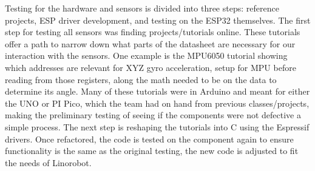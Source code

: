 \documentclass[conference]{IEEEtran}
\begin{document}
Testing for the hardware and sensors is divided into three steps: reference projects, ESP driver development, and testing on the ESP32 themselves. The first step for testing all sensors was finding projects/tutorials online. These tutorials offer a path to narrow down what parts of the datasheet are necessary for our interaction with the sensors. One example is the MPU6050 tutorial showing which addresses are relevant for XYZ gyro acceleration, setup for MPU before reading from those registers, along the math needed to be on the data to determine its angle. Many of these tutorials were in Arduino and meant for either the UNO or PI Pico, which the team had on hand from previous classes/projects, making the preliminary testing of seeing if the components were not defective a simple process. The next step is reshaping the tutorials into C using the Espressif drivers. Once refactored, the code is tested on the component again to ensure functionality is the same as the original testing, the new code is adjusted to fit the needs of Linorobot.
\end{document}
